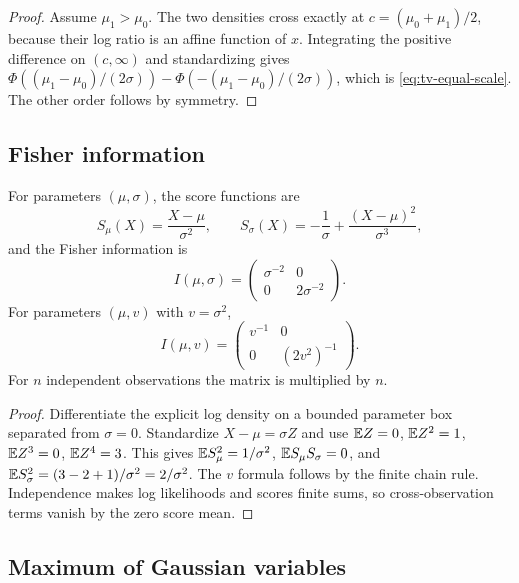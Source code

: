 \begin{proof}
Assume $\mu_1>\mu_0$.  The two densities cross exactly at $c=(\mu_0+\mu_1)/2$, because their log ratio is an affine function of $x$.  Integrating the positive difference on $(c,\infty)$ and standardizing gives
$\Phi((\mu_1-\mu_0)/(2\sigma))-\Phi(-(\mu_1-\mu_0)/(2\sigma))$, which is \eqref{eq:tv-equal-scale}.  The other order follows by symmetry.
\end{proof}

\subsection{Fisher information}

\begin{theorem}\label{thm:fisher}
For parameters $(\mu,\sigma)$, the score functions are
\[
 S_\mu(X)=\frac{X-\mu}{\sigma^2},
 \qquad
 S_\sigma(X)=-\frac1\sigma+\frac{(X-\mu)^2}{\sigma^3},
\]
and the Fisher information is
\begin{equation}\label{eq:fisher-musigma}
 I(\mu,\sigma)=
 \begin{pmatrix}
  \sigma^{-2}&0\\[1mm]
  0&2\sigma^{-2}
 \end{pmatrix}.
\end{equation}
For parameters $(\mu,v)$ with $v=\sigma^2$,
\begin{equation}\label{eq:fisher-muv}
 I(\mu,v)=
 \begin{pmatrix}
  v^{-1}&0\\[1mm]
  0&(2v^2)^{-1}
 \end{pmatrix}.
\end{equation}
For $n$ independent observations the matrix is multiplied by $n$.
\end{theorem}

\begin{proof}
Differentiate the explicit log density on a bounded parameter box separated from $\sigma=0$.  Standardize $X-\mu=\sigma Z$ and use $\mathbb E Z=0$, $\mathbb E Z^2=1$, $\mathbb E Z^3=0$, $\mathbb E Z^4=3$.  This gives
$\mathbb E S_\mu^2=1/\sigma^2$, $\mathbb E S_\mu S_\sigma=0$, and
$\mathbb E S_\sigma^2=(3-2+1)/\sigma^2=2/\sigma^2$.  The $v$ formula follows by the finite chain rule.  Independence makes log likelihoods and scores finite sums, so cross-observation terms vanish by the zero score mean.
\end{proof}

\subsection{Maximum of Gaussian variables}

